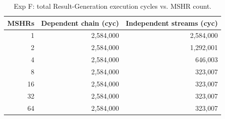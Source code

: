 \begin{table}[H]\centering\small
\begin{tabular}{rrr}\toprule
MSHRs & Dependent chain (cyc) & Independent streams (cyc) \\ \midrule
1 & 2,584,000 & 2,584,000 \\
2 & 2,584,000 & 1,292,001 \\
4 & 2,584,000 & 646,003 \\
8 & 2,584,000 & 323,007 \\
16 & 2,584,000 & 323,007 \\
32 & 2,584,000 & 323,007 \\
64 & 2,584,000 & 323,007 \\
\bottomrule\end{tabular}
\caption{Exp F: total Result-Generation execution cycles vs. MSHR count.}
\label{tab:expF}\end{table}

